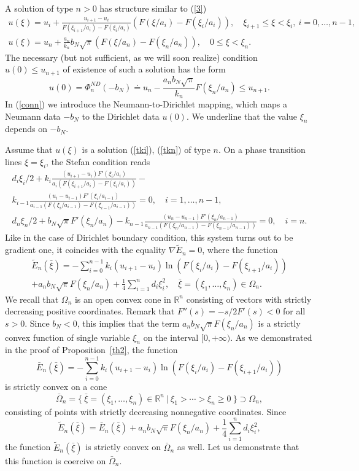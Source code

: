 \documentclass[12pt]{article}
\theoremstyle{plain}
\theoremstyle{definition}
\numberwithin{equation}{section}
\newcommand{\R}{{\mathbb R}}
\begin{document}
A solution of type $n>0$ has structure similar to (\ref{3})
\begin{align}\label{tki}
u(\xi)=u_i+\frac{u_{i+1}-u_i}{F(\xi_{i+1}/a_i)-F(\xi_i/a_i)}(F(\xi/a_i)-F(\xi_i/a_i)), \quad
\xi_{i+1}\le\xi<\xi_i, \ i=0,\ldots,n-1, \\
\label{tkn}
u(\xi)=u_n+\frac{a_n}{k_n}b_N\sqrt{\pi}(F(\xi/a_n)-F(\xi_n/a_n)), \quad 0\le\xi<\xi_n.
\end{align}
The necessary (but not sufficient, as we will soon realize) condition $u(0)\le u_{n+1}$ of existence of such a solution has the form
\begin{equation}\label{conn}
u(0)=\Phi^{ND}_n(-b_N)\doteq u_n-\frac{a_nb_N\sqrt{\pi}}{k_n} F(\xi_n/a_n)\le u_{n+1}.
\end{equation}
In (\ref{conn}) we introduce the Neumann-to-Dirichlet mapping, which maps a Neumann data $-b_N$ to the Dirichlet data $u(0)$. We underline that the value $\xi_n$ depends on $-b_N$.

Assume that $u(\xi)$ is a solution (\ref{tki}), (\ref{tkn}) of type $n$.
On a phase transition lines $\xi=\xi_i$, the Stefan condition reads
\begin{align}\label{sysi}
d_i\xi_i/2+k_i\frac{(u_{i+1}-u_i)F'(\xi_i/a_i)}{a_i(F(\xi_{i+1}/a_i)-F(\xi_i/a_i))}- \nonumber\\
k_{i-1}\frac{(u_i-u_{i-1})F'(\xi_i/a_{i-1})}{a_{i-1}(F(\xi_i/a_{i-1})-F(\xi_{i-1}/a_{i-1}))}=0, \quad i=1,\ldots,n-1, \\
\label{sysn}
d_n\xi_n/2+b_N\sqrt{\pi} F'(\xi_n/a_n)- k_{n-1}\frac{(u_n-u_{n-1})F'(\xi_n/a_{n-1})}{a_{n-1}(F(\xi_n/a_{n-1})-F(\xi_{n-1}/a_{n-1}))}=0, \quad i=n.
\end{align}
Like in the case of Dirichlet boundary condition, this system turns out to be gradient one, it coincides with the equality $\nabla\tilde E_n=0$, where the function
\begin{align}\label{E}
\tilde E_n(\bar\xi)=-\sum_{i=0}^{n-1}k_i(u_{i+1}-u_i)\ln (F(\xi_i/a_i)-F(\xi_{i+1}/a_i))\nonumber\\
+a_nb_N\sqrt{\pi}F(\xi_n/a_n)+\frac{1}{4}\sum_{i=1}^n d_i\xi_i^2, \quad \bar\xi=(\xi_1,\ldots,\xi_n)\in\Omega_n.
\end{align}
We recall that $\Omega_n$ is an open convex cone in $\R^n$ consisting of vectors with strictly decreasing positive coordinates.
Remark that $F''(s)=-s/2F'(s)<0$ for all $s>0$. Since $b_N<0$, this implies that the term $a_nb_N\sqrt{\pi}F(\xi_n/a_n)$ is a strictly convex function of single variable $\xi_n$ on the interval $[0,+\infty)$. As we demonstrated in the proof of Proposition~\ref{th2}, the function
\[
\bar E_n(\bar\xi)=-\sum_{i=0}^{n-1}k_i(u_{i+1}-u_i)\ln (F(\xi_i/a_i)-F(\xi_{i+1}/a_i))
\]
is strictly convex on a cone
\[\bar\Omega_n=\{ \ \bar\xi=(\xi_1,\ldots,\xi_n)\in\R^n \ | \ \xi_1>\cdots>\xi_n\ge 0 \ \}\supset\Omega_n,\]
consisting of points with strictly decreasing nonnegative coordinates. Since
\[\tilde E_n(\bar\xi)=\bar E_n(\bar\xi)+a_nb_N\sqrt{\pi}F(\xi_n/a_n)+\frac{1}{4}\sum_{i=1}^n d_i\xi_i^2,\] the function $\tilde E_n(\bar\xi)$ is strictly convex on $\bar\Omega_n$ as well.
Let us demonstrate that this function is coercive on $\bar\Omega_n$.
\end{document}
